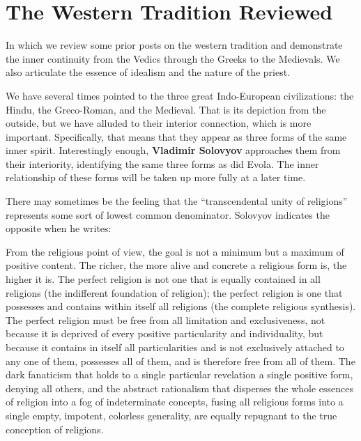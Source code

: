 \section{The Western Tradition Reviewed}
\begin{quotex}
In which we review some prior posts on the western tradition and demonstrate the inner continuity from the Vedics through the Greeks to the Medievals. We also articulate the essence of idealism and the nature of the priest.
\end{quotex}

We have several times pointed to the three great Indo-European civilizations: the Hindu, the Greco-Roman, and the Medieval. That is its depiction from the outside, but we have alluded to their interior connection, which is more important. Specifically, that means that they appear as three forms of the same inner spirit. Interestingly enough, \textbf{Vladimir Solovyov} approaches them from their interiority, identifying the same three forms as did Evola. The inner relationship of these forms will be taken up more fully at a later time.

There may sometimes be the feeling that the ``transcendental unity of religions'' represents some sort of lowest common denominator. Solovyov indicates the opposite when he writes:

\begin{quotex}
From the religious point of view, the goal is not a minimum but a maximum of positive content. The richer, the more alive and concrete a religious form is, the higher it is. The perfect religion is not one that is equally contained in all religions (the indifferent foundation of religion); the perfect religion is one that possesses and contains within itself all religions (the complete religious synthesis). The perfect religion must be free from all limitation and exclusiveness, not because it is deprived of every positive particularity and individuality, but because it contains in itself all particularities and is not exclusively attached to any one of them, possesses all of them, and is therefore free from all of them. The dark fanaticism that holds to a single particular revelation a single positive form, denying all others, and the abstract rationalism that disperses the whole essences of religion into a fog of indeterminate concepts, fusing all religious forms into a single empty, impotent, colorless generality, are equally repugnant to the true conception of religions.
\end{quotex}


